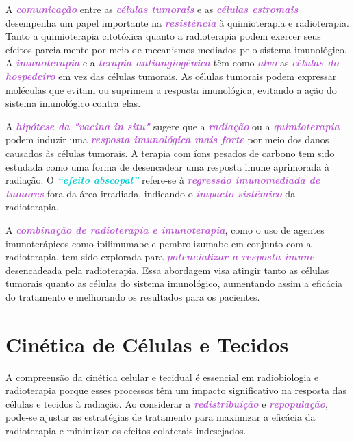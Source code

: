 \documentclass[11pt,a4paper]{article}
\begin{document}
	A \textcolor{MediumOrchid}{\textbf{\textit{comunicação}}} entre as \textcolor{MediumOrchid}{\textbf{\textit{células tumorais}}} e as \textcolor{MediumOrchid}{\textbf{\textit{células estromais}}} desempenha um papel importante na \textcolor{MediumOrchid}{\textbf{\textit{resistência}}} à quimioterapia e radioterapia. Tanto a quimioterapia citotóxica quanto a radioterapia podem exercer seus efeitos parcialmente por meio de mecanismos mediados pelo sistema imunológico. A \textcolor{MediumOrchid}{\textbf{\textit{imunoterapia}}} e a \textcolor{MediumOrchid}{\textbf{\textit{terapia antiangiogênica}}} têm como \textcolor{MediumOrchid}{\textbf{\textit{alvo}}} as \textcolor{MediumOrchid}{\textbf{\textit{células do hospedeiro}}} em vez das células tumorais. As células tumorais podem expressar moléculas que evitam ou suprimem a resposta imunológica, evitando a ação do sistema imunológico contra elas.

	A \textcolor{MediumOrchid}{\textbf{\textit{hipótese da "vacina in situ"}}} sugere que a \textcolor{MediumOrchid}{\textbf{\textit{radiação}}} ou a \textcolor{MediumOrchid}{\textbf{\textit{quimioterapia}}} podem induzir uma \textcolor{MediumOrchid}{\textbf{\textit{resposta imunológica mais forte}}} por meio dos danos causados às células tumorais. A terapia com íons pesados de carbono tem sido estudada como uma forma de desencadear uma resposta imune aprimorada à radiação. O \textcolor{DarkTurquoise}{\textbf{\textit{``efeito abscopal''}}} refere-se à \textcolor{MediumOrchid}{\textbf{\textit{regressão imunomediada de tumores}}} fora da área irradiada, indicando o \textcolor{MediumOrchid}{\textbf{\textit{impacto sistêmico}}} da radioterapia.

	A \textcolor{MediumOrchid}{\textbf{\textit{combinação de radioterapia e imunoterapia}}}, como o uso de agentes imunoterápicos como ipilimumabe e pembrolizumabe em conjunto com a radioterapia, tem sido explorada para \textcolor{MediumOrchid}{\textbf{\textit{potencializar a resposta imune}}} desencadeada pela radioterapia. Essa abordagem visa atingir tanto as células tumorais quanto as células do sistema imunológico, aumentando assim a eficácia do tratamento e melhorando os resultados para os pacientes.

\section{Cinética de Células e Tecidos}

	A compreensão da cinética celular e tecidual é essencial em radiobiologia e radioterapia porque esses processos têm um impacto significativo na resposta das células e tecidos à radiação. Ao considerar a \textcolor{MediumOrchid}{\textbf{\textit{redistribuição}}} e \textcolor{MediumOrchid}{\textbf{\textit{repopulação}}}, pode-se ajustar as estratégias de tratamento para maximizar a eficácia da radioterapia e minimizar os efeitos colaterais indesejados.
\end{document}
